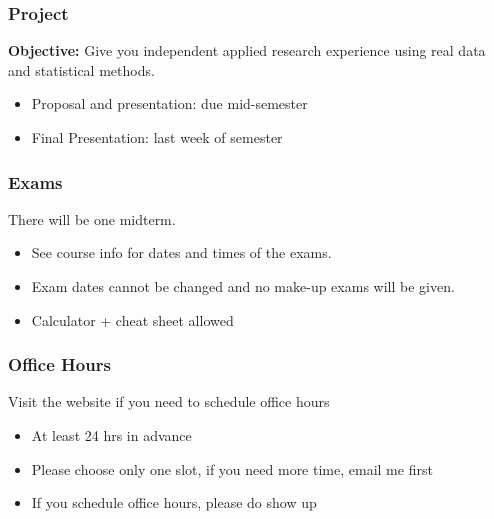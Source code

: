 \documentclass[11pt]{beamer}
\begin{document}
\begin{frame}
\frametitle{Project}

\alert{\textbf{Objective:}} Give you independent applied research experience using real data and 
statistical methods.

\begin{itemize}

\item Proposal and presentation: due mid-semester

\item Final Presentation: last week of semester


\end{itemize}

\end{frame}





\begin{frame}
\frametitle{Exams}



There will be one midterm.
\begin{itemize}
\item See course info for dates and times of the exams. 
\item Exam dates cannot be changed and no make-up exams will be given.
\item Calculator + cheat sheet allowed

\end{itemize}

\end{frame}




\begin{frame}
\frametitle{Office Hours}
Visit the website if you need to schedule office hours
\begin{itemize}
\item At least 24 hrs in advance
\item Please choose only one slot, if you need more time, email me first 
\item If you schedule office hours, please do show up 
\end{itemize}
\end{frame}
\end{document}
